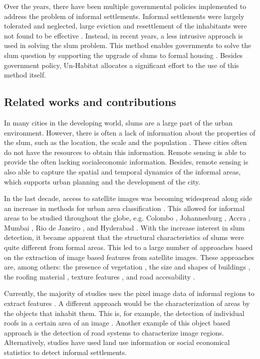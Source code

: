 Over the years, there have been multiple governmental policies implemented to address the problem of informal settlements. Informal settlements were largely tolerated and neglected, large eviction and resettlement of the inhabitants were not found to be effective \cite{kuffer2016slums}. Instead, in recent years, a less intrusive approach is used in solving the slum problem. This method enables governments to solve the slum question by supporting the upgrade of slums to formal housing \cite{cobbett2013cities}. Besides government policy, Un-Habitat allocates a significant effort to the use of this method itself\cite{2015globact}.

\subsection{Related works and contributions}
In many cities in the developing world, slums are a large part of the urban environment. However, there is often a lack of information about the properties of the slum, such as the location, the scale and the population \cite{kuffer2016slums}. These cities often do not have the resources to obtain this information. Remote sensing is able to provide the often lacking  socialeconomic information. Besides, remote sensing is also able to capture the spatial and temporal dynamics of the informal areas, which supports urban planning and the development of the city.

In the last decade, access to satellite images was becoming widespread along side an increase in methods for urban area classification \cite{kuffer2016slums}. This allowed for informal areas to be studied throughout the globe, e.g. Colombo \cite{colombo}, Johannesburg \cite{williams2016automatic}, Accra \cite{accra}, Mumbai \cite{mumbai}, Rio de Janeiro \cite{hofmann2008detecting}, and Hyderabad \cite{hyderabad}. With the increase interest in slum detection, it became apparent that the structural characteristics of slums were quite different from formal areas. This led to a large number of approaches based on the extraction of  image based features from satellite images. These approaches are, among others: the presence of vegetation \cite{niebergall2007object}, the size and shapes of buildings \cite{hofmann2008detecting}, the roofing material \cite{williams2016automatic}, texture features \cite{mattia2007exploiting}, and road accesability \cite{owen2013approach}.

Currently, the majority of studies uses the pixel image data of informal regions to extract features \cite{kuffer2016slums}. A different approach would be the characterization of areas by the objects that inhabit them. This is, for example, the detection of individual roofs in a certain area  of an image \cite{williams2016automatic}. Another example of this object based approach is the detection of road systems to characterize image regions. Alternatively, studies have used land use information \cite{novack2010urban} or social economical statistics \cite{engstrom2011using} to detect informal settlements.

